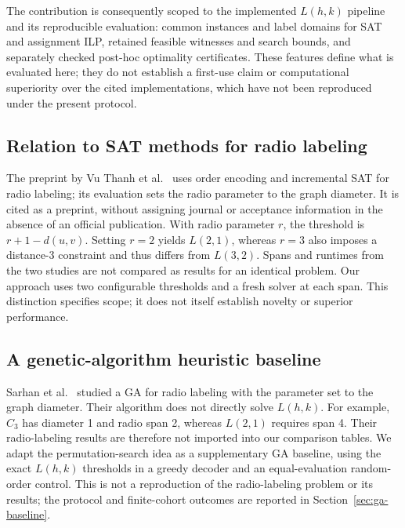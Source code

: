 The contribution is consequently scoped to the implemented $L(h,k)$
pipeline and its reproducible evaluation: common instances and label
domains for SAT and assignment ILP, retained feasible witnesses and search
bounds, and separately checked post-hoc optimality certificates. These
features define what is evaluated here; they do not establish a first-use
claim or computational superiority over the cited implementations, which
have not been reproduced under the present protocol.

\subsection{Relation to SAT methods for radio labeling}
The preprint by Vu Thanh et al.\ \cite{vu2026radio} uses order encoding and
incremental SAT for radio labeling; its evaluation sets the radio parameter
to the graph diameter. It is cited as a preprint, without assigning journal
or acceptance information in the absence of an official publication.
With radio parameter $r$, the threshold is $r+1-d(u,v)$. Setting $r=2$
yields $L(2,1)$, whereas $r=3$ also imposes a distance-3 constraint and thus
differs from $L(3,2)$. Spans and runtimes from the two studies are not compared
as results for an identical problem. Our approach uses two configurable
thresholds and a fresh solver at each span. This distinction specifies scope;
it does not itself establish novelty or superior performance.

\subsection{A genetic-algorithm heuristic baseline}
Sarhan et al.\ \cite{sarhan2026genetic} studied a GA for radio labeling with
the parameter set to the graph diameter. Their algorithm does not directly
solve $L(h,k)$. For example, $C_3$ has diameter 1 and radio span 2, whereas
$L(2,1)$ requires span 4. Their radio-labeling results are therefore not
imported into our comparison tables. We adapt the permutation-search idea as
a supplementary GA baseline, using the exact $L(h,k)$ thresholds in a greedy
decoder and an equal-evaluation random-order control. This is not a
reproduction of the radio-labeling problem or its results; the protocol and
finite-cohort outcomes are reported in Section~\ref{sec:ga-baseline}.
